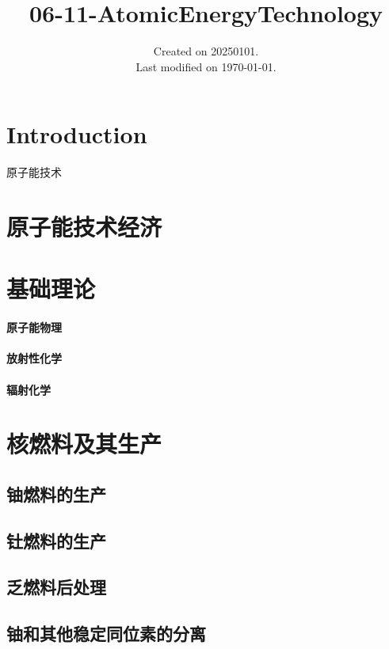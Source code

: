 \documentclass[UTF8]{../../ApplicationUniverse}
\begin{document}
\title{06-11-AtomicEnergyTechnology}
\date{Created on 20250101.\\   Last modified on \today.}
\maketitle
\tableofcontents


\chapter{Introduction}


原子能技术



\chapter{原子能技术经济}




\chapter{基础理论}
\subsubsection{原子能物理}
\subsubsection{放射性化学}
\subsubsection{辐射化学}



\chapter{核燃料及其生产}
\section{铀燃料的生产}
\section{钍燃料的生产}
\section{乏燃料后处理}
\section{铀和其他稳定同位素的分离}
\end{document}
